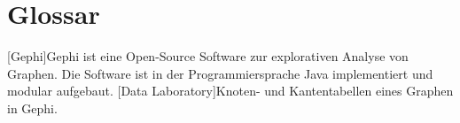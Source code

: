 \chapter*{Glossar}

\begin{acronym}
    [Gephi]{Gephi ist eine Open-Source Software zur explorativen
    Analyse von Graphen. Die Software ist in der Programmiersprache Java implementiert
    und modular aufgebaut.}
    [Data Laboratory]{Knoten- und Kantentabellen eines Graphen in Gephi.}
\end{acronym}
